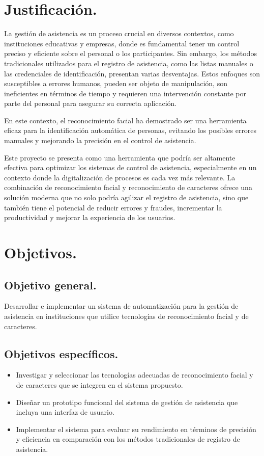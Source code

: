 \documentclass[12pt, letterpaper]{article}
\begin{document}
\section{Justificación.}
La gestión de asistencia es un proceso crucial en diversos contextos, como instituciones educativas y empresas, donde es fundamental tener un control preciso y eficiente sobre el personal o los participantes. Sin embargo, los métodos tradicionales utilizados para el registro de asistencia, como las listas manuales o las credenciales de identificación, presentan varias desventajas. Estos enfoques son susceptibles a errores humanos, pueden ser objeto de manipulación, son ineficientes en términos de tiempo y requieren una intervención constante por parte del personal para asegurar su correcta aplicación.

En este contexto, el reconocimiento facial ha demostrado ser una herramienta eficaz para la identificación automática de personas, evitando los posibles errores manuales y mejorando la precisión en el control de asistencia. 

Este proyecto se presenta como una herramienta que podría ser altamente efectiva para optimizar los sistemas de control de asistencia, especialmente en un contexto donde la digitalización de procesos es cada vez más relevante. La combinación de reconocimiento facial y reconocimiento de caracteres ofrece una solución moderna que no solo podría agilizar el registro de asistencia, sino que también tiene el potencial de reducir errores y fraudes, incrementar la productividad y mejorar la experiencia de los usuarios.
\FloatBarrier


\section{Objetivos.}
\subsection{Objetivo general.}
Desarrollar e implementar un sistema de automatización para la gestión de asistencia en instituciones que utilice tecnologías de reconocimiento facial y de caracteres.

\subsection{Objetivos específicos.}
\begin{itemize}
    \item Investigar y seleccionar las tecnologías adecuadas de reconocimiento facial y de caracteres que se integren en el sistema propuesto.
    \item Diseñar un prototipo funcional del sistema de gestión de asistencia que incluya una interfaz de usuario.
    \item Implementar el sistema para evaluar su rendimiento en términos de precisión y eficiencia en comparación con los métodos tradicionales de registro de asistencia.
\end{itemize}
\FloatBarrier
\end{document}
